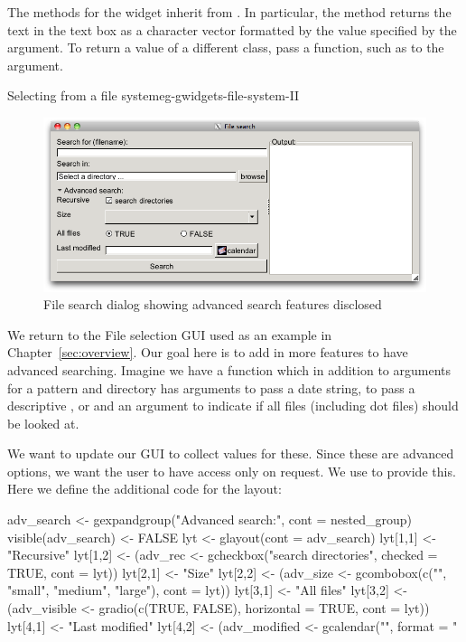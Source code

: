 The methods for the widget inherit from . In particular,
the  method returns the text in the text box
as a character vector formatted by the value specified by the
 argument. To return a value of a
different class, pass a function, such as  to the
 argument.



\begin{example}{Selecting from a file system}{eg-gwidgets-file-system-II}
\begin{figure}
  \centering
  \includegraphics[width=.8\textwidth]{fig-gWidgets-file-search-advanced.png}
  \caption{File search dialog showing advanced search features disclosed}
  \label{fig:file-search-advanced}
\end{figure}
We return to the File selection GUI used as an example in
Chapter~\ref{sec:overview}. Our goal here is to add in more features
to have advanced searching. Imagine we have a function  which in
addition to arguments for  a pattern and directory has arguments
 to pass a date string,  to pass a
descriptive ,  or  and an
argument  to indicate if all files (including dot files)
should be looked at. 

We want to update our GUI to collect values for these.
Since these are advanced options, we want the user to have access only
on request. We use  to provide this. Here we define
the additional code for the layout:


\begin{Schunk}
\begin{Sinput}
 adv_search <- gexpandgroup("Advanced search:", 
                            cont = nested_group)
 visible(adv_search) <- FALSE
 lyt <- glayout(cont = adv_search)
 lyt[1,1] <- "Recursive"
 lyt[1,2] <- (adv_rec <- 
    gcheckbox("search directories", checked = TRUE, cont = lyt))
 lyt[2,1] <- "Size"
 lyt[2,2] <- (adv_size <- 
    gcombobox(c("", "small", "medium", "large"),  cont = lyt))
 lyt[3,1] <- "All files"
 lyt[3,2] <- (adv_visible <- 
    gradio(c(TRUE, FALSE), horizontal = TRUE, cont = lyt))
 lyt[4,1] <- "Last modified"
 lyt[4,2] <- (adv_modified <- 
              gcalendar("", format = "%
\end{Sinput}
\end{Schunk}


\end{example}
